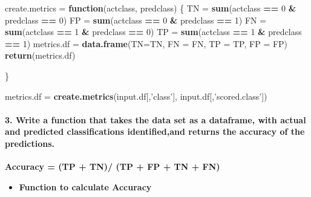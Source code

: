 \documentclass[]{article}
\newenvironment{Shaded}{\begin{snugshade}}{\end{snugshade}}
\newcommand{\ControlFlowTok}[1]{\textcolor[rgb]{0.13,0.29,0.53}{\textbf{#1}}}
\newcommand{\DataTypeTok}[1]{\textcolor[rgb]{0.13,0.29,0.53}{#1}}
\newcommand{\DecValTok}[1]{\textcolor[rgb]{0.00,0.00,0.81}{#1}}
\newcommand{\KeywordTok}[1]{\textcolor[rgb]{0.13,0.29,0.53}{\textbf{#1}}}
\newcommand{\NormalTok}[1]{#1}
\newcommand{\OperatorTok}[1]{\textcolor[rgb]{0.81,0.36,0.00}{\textbf{#1}}}
\newcommand{\StringTok}[1]{\textcolor[rgb]{0.31,0.60,0.02}{#1}}
\providecommand{\tightlist}{%
  \setlength{\itemsep}{0pt}\setlength{\parskip}{0pt}}
\let\oldparagraph\paragraph
\renewcommand{\paragraph}[1]{\oldparagraph{#1}\mbox{}}
\begin{document}
\begin{Shaded}
\begin{Highlighting}[]
\NormalTok{create.metrics =}\StringTok{ }\ControlFlowTok{function}\NormalTok{(actclass, predclass)}
\NormalTok{\{}
\NormalTok{  TN =}\StringTok{ }\KeywordTok{sum}\NormalTok{(actclass }\OperatorTok{==}\StringTok{ }\DecValTok{0} \OperatorTok{&}\StringTok{ }\NormalTok{predclass }\OperatorTok{==}\StringTok{ }\DecValTok{0}\NormalTok{)}
\NormalTok{  FP =}\StringTok{ }\KeywordTok{sum}\NormalTok{(actclass }\OperatorTok{==}\StringTok{ }\DecValTok{0} \OperatorTok{&}\StringTok{ }\NormalTok{predclass }\OperatorTok{==}\StringTok{ }\DecValTok{1}\NormalTok{)}
\NormalTok{  FN =}\StringTok{ }\KeywordTok{sum}\NormalTok{(actclass }\OperatorTok{==}\StringTok{ }\DecValTok{1} \OperatorTok{&}\StringTok{ }\NormalTok{predclass }\OperatorTok{==}\StringTok{ }\DecValTok{0}\NormalTok{)}
\NormalTok{  TP =}\StringTok{ }\KeywordTok{sum}\NormalTok{(actclass }\OperatorTok{==}\StringTok{ }\DecValTok{1} \OperatorTok{&}\StringTok{ }\NormalTok{predclass }\OperatorTok{==}\StringTok{ }\DecValTok{1}\NormalTok{)}
\NormalTok{  metrics.df =}\StringTok{ }\KeywordTok{data.frame}\NormalTok{(}\DataTypeTok{TN=}\NormalTok{TN, }\DataTypeTok{FN =}\NormalTok{ FN, }\DataTypeTok{TP =}\NormalTok{ TP, }\DataTypeTok{FP =}\NormalTok{ FP)}
  \KeywordTok{return}\NormalTok{(metrics.df)}
  
\NormalTok{\}}

\NormalTok{metrics.df =}\StringTok{ }\KeywordTok{create.metrics}\NormalTok{(input.df[,}\StringTok{'class'}\NormalTok{], input.df[,}\StringTok{'scored.class'}\NormalTok{])}
\end{Highlighting}
\end{Shaded}

\hypertarget{write-a-function-that-takes-the-data-set-as-a-dataframe-with-actual-and-predicted-classifications-identifiedand-returns-the-accuracy-of-the-predictions.}{%
\paragraph{3. Write a function that takes the data set as a dataframe,
with actual and predicted classifications identified,and returns the
accuracy of the
predictions.}\label{write-a-function-that-takes-the-data-set-as-a-dataframe-with-actual-and-predicted-classifications-identifiedand-returns-the-accuracy-of-the-predictions.}}

\textbf{Accuracy = (TP + TN)/ (TP + FP + TN + FN)}

\begin{itemize}
\tightlist
\item
  \textbf{Function to calculate Accuracy}
\end{itemize}
\end{document}
